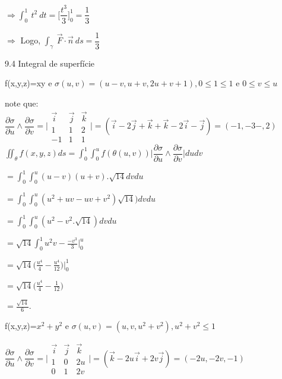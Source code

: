 \documentclass[11pt,a4paper]{article}
\newcommand{\integral}{\displaystyle\int}
\begin{document}
\begin{enumerate}
{{		$\Rightarrow \displaystyle\int_{0}^{1}\ t^2\ dt = \Bigg[\dfrac{t^3}{3}\Bigg]_0^1 = \dfrac{1}{3}$
		
		$\Rightarrow$ Logo, $\displaystyle\int_\gamma\ \vec{F} \cdot \vec{n}\ ds = \dfrac{1}{3}$

    
    \begin{center}
	\large 9.4 Integral de superfície 
	\end{center}

	\item f(x,y,z)=xy e $\sigma (u,v)=(u-v,u+v,2u+v+1),0\leq1\leq1$ e $0\leq v\leq u$

	note que: \newline
	$\dfrac{\partial \sigma}{\partial u} \wedge\dfrac{\partial \sigma}{\partial v}= 
	\bigg|\begin{array}{crl}
	     \Vec{i}  &  \vec{j}  &  \Vec{k}\\
	     1        &  1        &  2\\
	     -1       &  1        &  1
	\end{array} \bigg| 
	=(\vec{i}-2\vec{j}+\vec{k}+\vec{k}-2\vec{i}-\vec{j})=(-1,-3-,2) $ \newline
	$\iint_\theta f(x,y,z)ds=\integral_0^1 \integral_0^u f(\theta(u,v))
	\bigg|\dfrac{\partial \sigma}{\partial u} \wedge\dfrac{\partial \sigma}{\partial v}\bigg| dudv$ 
	
	$=\integral_0^1 \integral_0^u(u-v)(u+v).\sqrt{14}dvdu$
	
	$=\integral_0^1 \integral_0^u(u^{2}+uv-uv+v^{2})\sqrt{14})dvdu$
	
	$=\integral_0^1 \integral_0^u (u^{2}-v^{2}.\sqrt{14})dvdu$
	
    $=\sqrt{14}\integral_0^1u^{2}v-\frac{-v^{3}}{3}\bigg |_0^u$
    
	$=\sqrt{14}\bigg( \frac{u^{4}}{4}-\frac{u^{4}}{12}\bigg) \bigg|_0^1$
	
	$=\sqrt{14} \bigg( \frac{u^{4}}{4}-\frac{1}{12} \bigg)$
	
	$=\frac{\sqrt{14}}{6}.$\newline
    	    
	\item f(x,y,z)=$x^{2}+y^{2}$ e $\sigma(u,v)=(u,v,u^{2}+v^{2}),u^{2}+v^{2}\leq1$
	
	$\dfrac{\partial \sigma}{\partial u} \wedge\dfrac{\partial \sigma}{\partial v}= 
	\bigg|\begin{array}{crl}
	     \Vec{i}  &  \vec{j}  &  \Vec{k}\\
	     1        &  0        &  2u\\
	     0        &  1        &  2v
	\end{array} \bigg| 
	=(\vec{k}-2u\vec{i}+2v\vec{j})=(-2u,-2v,-1) $ \newline
	
}}
\end{enumerate}
\end{document}
